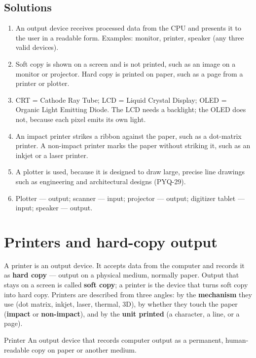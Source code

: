 \subsection*{Solutions}
\begingroup\small
\begin{enumerate}[label=\arabic*.]
  \item An output device receives processed data from the CPU and presents it
    to the user in a readable form. Examples: monitor, printer, speaker (any
    three valid devices).
  \item Soft copy is shown on a screen and is not printed, such as an image on
    a monitor or projector. Hard copy is printed on paper, such as a page from
    a printer or plotter.
  \item CRT = Cathode Ray Tube; LCD = Liquid Crystal Display; OLED = Organic
    Light Emitting Diode. The LCD needs a backlight; the OLED does not,
    because each pixel emits its own light.
  \item An impact printer strikes a ribbon against the paper, such as a
    dot-matrix printer. A non-impact printer marks the paper without striking
    it, such as an inkjet or a laser printer.
  \item A plotter is used, because it is designed to draw large, precise line
    drawings such as engineering and architectural designs (PYQ-29).
  \item Plotter --- output; scanner --- input; projector --- output; digitizer
    tablet --- input; speaker --- output.
\end{enumerate}
\endgroup

\section{Printers and hard-copy output}
A printer is an output device. It accepts data from the computer and records
it as \textbf{hard copy} --- output on a physical medium, normally paper.
Output that stays on a screen is called \textbf{soft copy}; a printer is the
device that turns soft copy into hard copy. Printers are described from three
angles: by the \textbf{mechanism} they use (dot matrix, inkjet, laser,
thermal, 3D), by whether they touch the paper (\textbf{impact} or
\textbf{non-impact}), and by the \textbf{unit printed} (a character, a line,
or a page).

\begin{definitionbox}{Printer}
An output device that records computer output as a permanent, human-readable
copy on paper or another medium.
\end{definitionbox}

